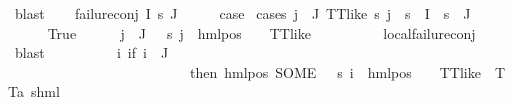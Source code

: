 \begin{isabellebody}
\ blast\isanewline
{}\isamarkupfalse%
\isanewline
\ \ \isamarkupfalse%
\ {\isacharparenleft}{\kern0pt}failure{\isacharunderscore}{\kern0pt}conj\ I\ {\isasympsi}s\ J{\isacharparenright}{\kern0pt}\isanewline
\ \ \isamarkupfalse%
\ \isamarkupfalse%
\ {\isacharquery}{\kern0pt}case\ \isamarkupfalse%
{\isacharparenleft}{\kern0pt}cases\ {\isachardoublequoteopen}{\isasymnot}{\isacharparenleft}{\kern0pt}{\isasymexists}j\ {\isasymin}\ J{\isachardot}{\kern0pt}\ TT{\isacharunderscore}{\kern0pt}like\ {\isacharparenleft}{\kern0pt}{\isasympsi}s\ j{\isacharparenright}{\kern0pt}{\isacharparenright}{\kern0pt}\ {\isasymand}\ {\isasympsi}s\ {\isacharbackquote}{\kern0pt}\ I\ {\isasyminter}\ {\isasympsi}s\ {\isacharbackquote}{\kern0pt}\ J\ {\isacharequal}{\kern0pt}\ {\isacharbraceleft}{\kern0pt}{\isacharbraceright}{\kern0pt}{\isachardoublequoteclose}{\isacharparenright}{\kern0pt}\isanewline
\ \ \ \ \isamarkupfalse%
\ True\isanewline
\ \ \ \ \isamarkupfalse%
\ {\isachardoublequoteopen}{\isasymforall}j\ {\isasymin}\ J{\isachardot}{\kern0pt}\ {\isacharparenleft}{\kern0pt}{\isasymexists}{\isasymalpha}\ {\isasymchi}{\isachardot}{\kern0pt}\ {\isasympsi}s\ j\ {\isacharequal}{\kern0pt}\ hml{\isacharunderscore}{\kern0pt}pos\ {\isasymalpha}\ {\isasymchi}\ {\isasymand}\ TT{\isacharunderscore}{\kern0pt}like\ {\isasymchi}{\isacharparenright}{\kern0pt}{\isachardoublequoteclose}\ \isanewline
\ \ \ \ \ \ \isamarkupfalse%
\ local{\isachardot}{\kern0pt}failure{\isacharunderscore}{\kern0pt}conj\ \isamarkupfalse%
\ blast\isanewline
\ \ \ \ \isamarkupfalse%
\ {\isasymPsi}\ \ {\isachardoublequoteopen}{\isasymPsi}\ {\isasymequiv}\ {\isacharparenleft}{\kern0pt}{\isasymlambda}i{\isachardot}{\kern0pt}\ {\isacharparenleft}{\kern0pt}if\ i\ {\isasymin}\ J\isanewline
\ \ \ \ \ \ \ \ \ \ \ \ \ \ \ \ \ \ \ \ \ \ \ \ \ \ then\ {\isacharparenleft}{\kern0pt}hml{\isacharunderscore}{\kern0pt}pos\ {\isacharparenleft}{\kern0pt}SOME\ {\isasymalpha}{\isachardot}{\kern0pt}\ {\isasymexists}{\isasymchi}{\isachardot}{\kern0pt}\ {\isasympsi}s\ i\ {\isacharequal}{\kern0pt}\ hml{\isacharunderscore}{\kern0pt}pos\ {\isasymalpha}\ {\isasymchi}\ {\isasymand}\ TT{\isacharunderscore}{\kern0pt}like\ {\isasymchi}{\isacharparenright}{\kern0pt}\ TT{\isacharparenright}{\kern0pt}{\isacharcolon}{\kern0pt}{\isacharcolon}{\kern0pt}{\isacharparenleft}{\kern0pt}{\isacharprime}{\kern0pt}a{\isacharcomma}{\kern0pt}\ {\isacharprime}{\kern0pt}s{\isacharparenright}{\kern0pt}hml\ \isanewline

\end{isabellebody}
